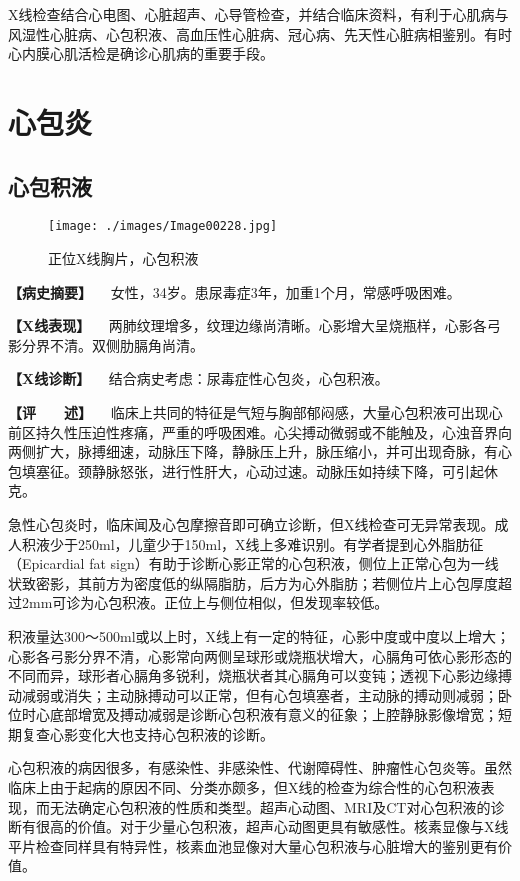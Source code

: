 X线检查结合心电图、心脏超声、心导管检查，并结合临床资料，有利于心肌病与风湿性心脏病、心包积液、高血压性心脏病、冠心病、先天性心脏病相鉴别。有时心内膜心肌活检是确诊心肌病的重要手段。

\section{心包炎}

\subsection{心包积液}

\begin{figure}[!htbp]
 \centering
 \texttt{[image: ./images/Image00228.jpg]}
 \captionsetup{justification=centering}
 \caption{正位X线胸片，心包积液}
 \label{fig4-8-1}
  \end{figure} 

\textbf{【病史摘要】}
　女性，34岁。患尿毒症3年，加重1个月，常感呼吸困难。

\textbf{【X线表现】}
　两肺纹理增多，纹理边缘尚清晰。心影增大呈烧瓶样，心影各弓影分界不清。双侧肋膈角尚清。

\textbf{【X线诊断】} 　结合病史考虑：尿毒症性心包炎，心包积液。

\textbf{【评　　述】}
　临床上共同的特征是气短与胸部郁闷感，大量心包积液可出现心前区持久性压迫性疼痛，严重的呼吸困难。心尖搏动微弱或不能触及，心浊音界向两侧扩大，脉搏细速，动脉压下降，静脉压上升，脉压缩小，并可出现奇脉，有心包填塞征。颈静脉怒张，进行性肝大，心动过速。动脉压如持续下降，可引起休克。

急性心包炎时，临床闻及心包摩擦音即可确立诊断，但X线检查可无异常表现。成人积液少于250ml，儿童少于150ml，X线上多难识别。有学者提到心外脂肪征（Epicardial
fat
sign）有助于诊断心影正常的心包积液，侧位上正常心包为一线状致密影，其前方为密度低的纵隔脂肪，后方为心外脂肪；若侧位片上心包厚度超过2mm可诊为心包积液。正位上与侧位相似，但发现率较低。

积液量达300～500ml或以上时，X线上有一定的特征，心影中度或中度以上增大；心影各弓影分界不清，心影常向两侧呈球形或烧瓶状增大，心膈角可依心影形态的不同而异，球形者心膈角多锐利，烧瓶状者其心膈角可以变钝；透视下心影边缘搏动减弱或消失；主动脉搏动可以正常，但有心包填塞者，主动脉的搏动则减弱；卧位时心底部增宽及搏动减弱是诊断心包积液有意义的征象；上腔静脉影像增宽；短期复查心影变化大也支持心包积液的诊断。

心包积液的病因很多，有感染性、非感染性、代谢障碍性、肿瘤性心包炎等。虽然临床上由于起病的原因不同、分类亦颇多，但X线的检查为综合性的心包积液表现，而无法确定心包积液的性质和类型。超声心动图、MRI及CT对心包积液的诊断有很高的价值。对于少量心包积液，超声心动图更具有敏感性。核素显像与X线平片检查同样具有特异性，核素血池显像对大量心包积液与心脏增大的鉴别更有价值。

